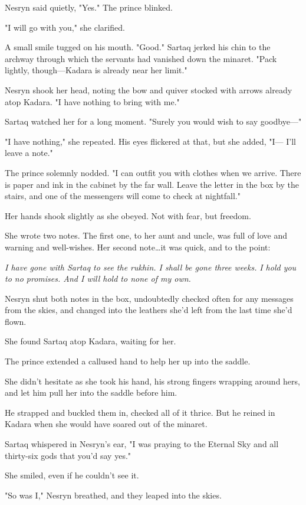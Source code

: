 Nesryn said quietly, "Yes."
The prince blinked.

"I will go with you," she clarified.

A small smile tugged on his mouth.
"Good."
Sartaq jerked his chin to the archway through which the servants had vanished down the minaret.
"Pack lightly, though---Kadara is already near her limit."

Nesryn shook her head, noting the bow and quiver stocked with arrows already atop Kadara.
"I have nothing to bring with me."

Sartaq watched her for a long moment.
"Surely you would wish to say goodbye---"

"I have nothing," she repeated.
His eyes flickered at that, but she added, "I--- I'll leave a note."

The prince solemnly nodded.
"I can outfit you with clothes when we arrive.
There is paper and ink in the cabinet by the far wall.
Leave the letter in the box by the stairs, and one of the messengers will come to check at nightfall."

Her hands shook slightly as she obeyed.
Not with fear, but 
freedom.

She wrote two notes.
The first one, to her aunt and uncle, was full of love and warning and well-wishes.
Her second note\ldots it was quick, and to the point:

\emph{I have gone with Sartaq to see the rukhin.
I shall be gone three weeks.} \emph{I hold you to no promises.
And I will hold to none of my own.}

Nesryn shut both notes in the box, undoubtedly checked often for any messages from the skies, and changed into the leathers she'd left from the last time she'd flown.

She found Sartaq atop Kadara, waiting for her.

The prince extended a callused hand to help her up into the saddle.

She didn't hesitate as she took his hand, his strong fingers wrapping around hers, and let him pull her into the saddle before him.

He strapped and buckled them in, checked all of it thrice.
But he reined in Kadara when she would have soared out of the minaret.

Sartaq whispered in Nesryn's ear, "I was praying to the Eternal Sky and all thirty-six gods that you'd say yes."

She smiled, even if he couldn't see it.

"So was I," Nesryn breathed, and they leaped into the skies.

